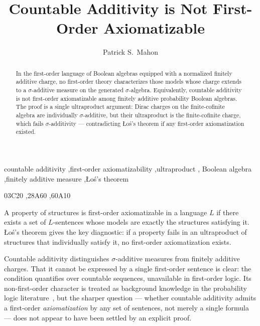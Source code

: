 \documentclass[preprint,12pt]{elsarticle}
\theoremstyle{definition}
\begin{document}
\begin{frontmatter}

\title{Countable Additivity is Not First-Order Axiomatizable}

\author{Patrick S.\ Mahon}
\address{Research Computing Group, Simon Fraser University, Burnaby, BC, Canada}

\begin{abstract}
In the first-order language of Boolean algebras equipped with a normalized finitely
additive charge, no first-order theory characterizes those models whose charge extends
to a $\sigma$-additive measure on the generated $\sigma$-algebra.  Equivalently,
countable additivity is not first-order axiomatizable among finitely additive probability
Boolean algebras.  The proof is a single ultraproduct argument: Dirac charges on the
finite-cofinite algebra are individually $\sigma$-additive, but their ultraproduct is
the finite-cofinite charge, which fails $\sigma$-additivity --- contradicting
\L{}o\'{s}'s theorem if any first-order axiomatization existed.
\end{abstract}

\begin{keyword}
countable additivity \sep first-order axiomatizability \sep ultraproduct \sep
Boolean algebra \sep finitely additive measure \sep \L{}o\'s's theorem

\MSC[2020] 03C20 \sep 28A60 \sep 60A10
\end{keyword}

\end{frontmatter}

A property of structures is first-order axiomatizable in a language $L$ if there exists
a set of $L$-sentences whose models are exactly the structures satisfying it.
\L{}o\'{s}'s theorem gives the key diagnostic: if a property fails in an ultraproduct
of structures that individually satisfy it, no first-order axiomatization exists.

Countable additivity distinguishes $\sigma$-additive measures from finitely additive
charges.  That it cannot be expressed by a single first-order sentence is clear: the
condition quantifies over countable sequences, unavailable in first-order logic.  Its
non-first-order character is treated as background knowledge in the probability logic
literature~\cite{Hoover1978,Keisler1985,FaginHalpernMegiddo1990}, but the sharper
question --- whether countable additivity admits a first-order \emph{axiomatization}
by any set of sentences, not merely a single formula --- does not appear to have been
settled by an explicit proof.
\end{document}
